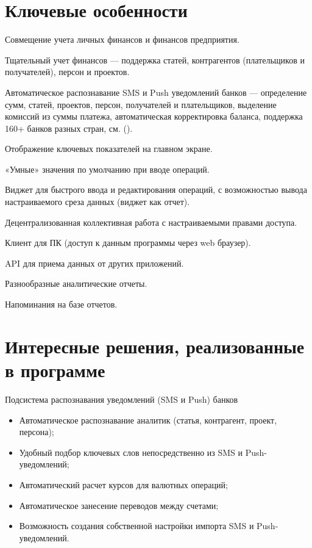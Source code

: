\documentclass[a4paper,10pt,russian]{sphinxmanual}
\begin{document}
\noindent{}

\noindent{}


\section{Ключевые особенности}
\label{\detokenize{about:id2}}
Совмещение учета личных финансов и финансов предприятия.

Тщательный учет финансов — поддержка статей, контрагентов (плательщиков и получателей), персон и проектов.

Автоматическое распознавание SMS и Push уведомлений банков — определение сумм, статей, проектов, персон,
получателей и плательщиков, выделение комиссий из суммы платежа, автоматическая корректировка баланса,
поддержка 160+ банков разных стран, см. {\hyperref[\detokenize{banks:chapter-supported-banks}]{}} ().

Отображение ключевых показателей на главном экране.

«Умные» значения по умолчанию при вводе операций.

Виджет для быстрого ввода и редактирования операций, с возможностью вывода настраиваемого среза данных (виджет как отчет).

Децентрализованная коллективная работа с настраиваемыми правами доступа.

Клиент для ПК (доступ к данным программы через web браузер).

API для приема данных от других приложений.

Разнообразные аналитические отчеты.

Напоминания на базе отчетов.


\section{Интересные решения, реализованные в программе}
\label{\detokenize{about:id3}}
Подсистема распознавания уведомлений (SMS и Push) банков
\begin{itemize}
\item {} 
Автоматическое распознавание аналитик (статья, контрагент, проект, персона);

\item {} 
Удобный подбор ключевых слов непосредственно из SMS и Push-уведомлений;

\item {} 
Автоматический расчет курсов для валютных операций;

\item {} 
Автоматическое занесение переводов между счетами;

\item {} 
Возможность создания собственной настройки импорта SMS и Push-уведомлений.

\end{itemize}
\end{document}
